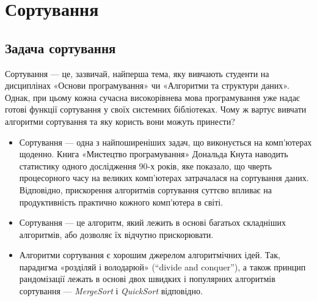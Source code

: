 \documentclass[12pt,a4paper]{report}
\begin{document}
\chapter{Сортування}

\begingroup
\let\clearpage\relax
\tableofcontents
\endgroup

\pagebreak



\section{Задача сортування}

Сортування --- це, зазвичай, найперша тема, яку вивчають студенти на дисциплінах «Основи програмування» чи «Алгоритми та структури даних».
Однак, при цьому кожна сучасна високорівнева мова програмування уже надає готові функції сортування у своїх системних бібліотеках.
Чому ж вартує вивчати алгоритми сортування та яку користь вони можуть принести?

\begin{itemize}
    \item Сортування --- одна з найпоширеніших задач, що виконується на комп’ютерах щоденно.
        Книга «Мистецтво програмування» Дональда Кнута наводить статистику одного дослідження 90-х років, яке показало, що чверть процесорного часу на великих комп'ютерах затрачалася на сортування даних.
        Відповідно, прискорення алгоритмів сортування суттєво впливає на продуктивність практично кожного комп’ютера в світі.
    \item Сортування --- це алгоритм, який лежить в основі багатьох складніших алгоритмів, або дозволяє їх відчутно прискорювати.
    \item Алгоритми сортування є хорошим джерелом алгоритмічних ідей.
        Так, парадигма «розділяй і володарюй» (``divide and conquer''), а також принцип рандомізації лежать в основі двох швидких і популярних алгоритмів сортування --- \emph{MergeSort} і \emph{QuickSort} відповідно.
\end{itemize}
\end{document}
